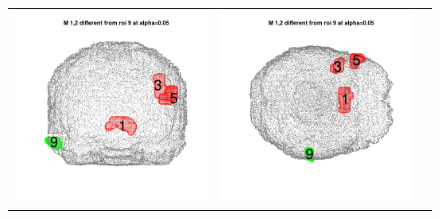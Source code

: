 \documentclass[12pt]{article}
\begin{document}
\begin{figure}[h]
\begin{tabular}{ccc}
\includegraphics[scale = 0.24]{../a7plots/d_2r_9_view2.png} & 
\includegraphics[scale = 0.24]{../a7plots/d_2r_9_view3.png} \\ 

\end{tabular}
\end{figure}
\end{document}
